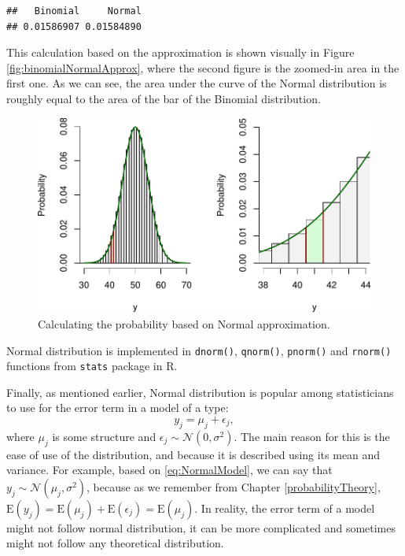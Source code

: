 \documentclass[
]{book}
\theoremstyle{definition}
\theoremstyle{definition}
\theoremstyle{definition}
\theoremstyle{definition}
\theoremstyle{remark}
\begin{document}
\begin{verbatim}
##   Binomial     Normal 
## 0.01586907 0.01584890
\end{verbatim}

This calculation based on the approximation is shown visually in Figure \ref{fig:binomialNormalApprox}, where the second figure is the zoomed-in area in the first one. As we can see, the area under the curve of the Normal distribution is roughly equal to the area of the bar of the Binomial distribution.

\begin{figure}
\centering
\includegraphics{Svetunkov---Statistics-for-Business-Analytics_files/figure-latex/binomialNormalApproxArea-1.pdf}
\caption{\label{fig:binomialNormalApproxArea}Calculating the probability based on Normal approximation.}
\end{figure}

Normal distribution is implemented in \texttt{dnorm()}, \texttt{qnorm()}, \texttt{pnorm()} and \texttt{rnorm()} functions from \texttt{stats} package in R.

Finally, as mentioned earlier, Normal distribution is popular among statisticians to use for the error term in a model of a type:
\begin{equation}
    y_j = \mu_j + \epsilon_j,
    \label{eq:NormalModel}
\end{equation}
where \(\mu_j\) is some structure and \(\epsilon_j \sim \mathcal{N}(0, \sigma^2)\). The main reason for this is the ease of use of the distribution, and because it is described using its mean and variance. For example, based on \eqref{eq:NormalModel}, we can say that \(y_j \sim \mathcal{N}(\mu_j, \sigma^2)\), because as we remember from Chapter \ref{probabilityTheory}, \(\mathrm{E}(y_j)=\mathrm{E}(\mu_j) + \mathrm{E}(\epsilon_j)=\mathrm{E}(\mu_j)\). In reality, the error term of a model might not follow normal distribution, it can be more complicated and sometimes might not follow any theoretical distribution.
\end{document}
